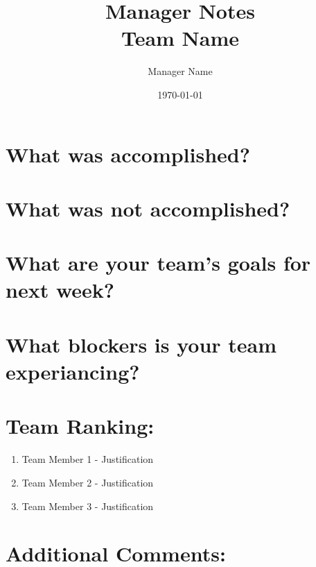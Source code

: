 \documentclass{article}
\title{Manager Notes \\
    \Large{Team Name}
}
\author{Manager Name}
\date{\today}
\begin{document}
\maketitle



\section{What was accomplished? }








\section{What was not accomplished?}







\section{What are your team's goals for next week?}








\section{What blockers is your team experiancing?}









\section{Team Ranking:}
\begin{enumerate}
  \item Team Member 1 - Justification
  \item Team Member 2 - Justification
  \item Team Member 3 - Justification
\end{enumerate}


\section{Additional Comments:}






\end{document}
